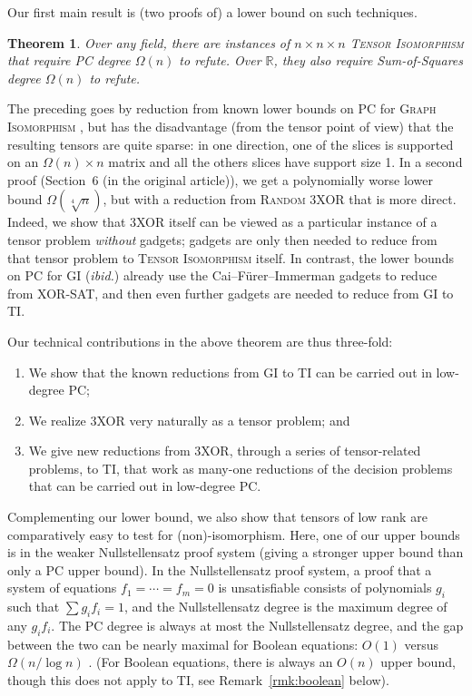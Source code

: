 \documentclass[10pt,a4paper]{article}
\newtheorem{theorem}{Theorem}[section]
\theoremstyle{definition}
\newcommand{\R}{\mathbb{R}}
\begin{document}
Our first main result is (two proofs of) a lower bound on such techniques.

\begin{theorem} \label{thm:lowerMain}
Over any field, there are instances of $n \times n \times n$ \textsc{Tensor Isomorphism} that require PC degree $\Omega(n)$ to refute. Over $\R$, they also require Sum-of-Squares degree $\Omega(n)$ to refute.
\end{theorem}

The preceding goes by reduction from known lower bounds on PC for \textsc{Graph Isomorphism} \cite{BerkholzG15, BerkholzG16}, but has the disadvantage (from the tensor point of view) that the resulting tensors are quite sparse: in one direction, one of the slices is supported on an $\Omega(n) \times n$ matrix and all the others slices have support size 1. In a second proof (Section~6 (in the original article)), we get a polynomially worse lower bound $\Omega(\sqrt[4]{n})$, but with a reduction from \textsc{Random 3XOR} that is more direct. Indeed, we show that 3XOR itself can be viewed as a particular instance of a tensor problem \emph{without} gadgets; gadgets are only then needed to reduce from that tensor problem to \textsc{Tensor Isomorphism} itself. In contrast, the lower bounds on PC for \textsc{GI} (\emph{ibid.}) already use the Cai--F\"{u}rer--Immerman gadgets \cite{CFI} to reduce from XOR-SAT, and then even further gadgets are needed to reduce from \textsc{GI} to \textsc{TI}. 

Our technical contributions in the above theorem are thus three-fold: 
\begin{enumerate}
\item We show that the known reductions from \textsc{GI} to \textsc{TI} can be carried out in low-degree PC; 
\item We realize 3XOR very naturally as a tensor problem; and 
\item We give new reductions from 3XOR, through a series of tensor-related problems, to \textsc{TI}, that work as many-one reductions of the decision problems that can be carried out in low-degree PC.
\end{enumerate}

Complementing our lower bound, we also show that tensors of low rank are comparatively easy to test for (non)-isomorphism. Here, one of our upper bounds is in the weaker Nullstellensatz proof system (giving a stronger upper bound than only a PC upper bound). In the Nullstellensatz proof system, a proof that a system of equations $f_1 = \dotsb = f_m = 0$ is unsatisfiable consists of polynomials $g_i$ such that $\sum g_i f_i = 1$, and the Nullstellensatz degree is the maximum degree of any $g_i f_i$. The PC degree is always at most the Nullstellensatz degree, and the gap between the two can be nearly maximal for Boolean equations: $O(1)$ versus $\Omega(n / \log n)$ \cite{BCIP}. (For Boolean equations, there is always an $O(n)$ upper bound, though this does not apply to \textsc{TI}, see Remark~\ref{rmk:boolean} below).
\end{document}
